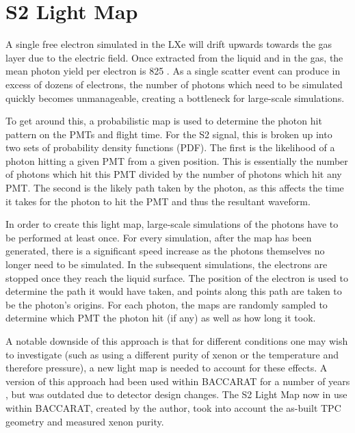 \section{S2 Light Map}
\label{sec:s2lightmap}
\par
A single free electron simulated in the LXe will drift upwards towards the gas layer due to the electric field.
Once extracted from the liquid and in the gas, the mean photon yield per electron is 825 \cite{NoPhotonsPerElectron}.
As a single scatter event can produce in excess of dozens of electrons, the number of photons which need to be simulated quickly becomes unmanageable, creating a bottleneck for large-scale simulations.
\par
To get around this, a probabilistic map is used to determine the photon hit pattern on the PMTs and flight time.
For the S2 signal, this is broken up into two sets of probability density functions (PDF).
The first is the likelihood of a photon hitting a given PMT from a given position.
This is essentially the number of photons which hit this PMT divided by the number of photons which hit any PMT.
The second is the likely path taken by the photon, as this affects the time it takes for the photon to hit the PMT and thus the resultant waveform.
\par
In order to create this light map, large-scale simulations of the photons have to be performed at least once.
For every simulation, after the map has been generated, there is a significant speed increase as the photons themselves no longer need to be simulated.
In the subsequent simulations, the electrons are stopped once they reach the liquid surface.
The position of the electron is used to determine the path it would have taken, and points along this path are taken to be the photon's origins. %
For each photon, the maps are randomly sampled to determine which PMT the photon hit (if any) as well as how long it took.

\par
A notable downside of this approach is that for different conditions one may wish to investigate (such as using a different purity of xenon or the temperature and therefore pressure), a new light map is needed to account for these effects.
A version of this approach had been used within BACCARAT for a number of years \cite{lz_simulations_ref}, but was outdated due to detector design changes.
The S2 Light Map now in use within BACCARAT, created by the author, took into account the as-built TPC geometry and measured xenon purity.

